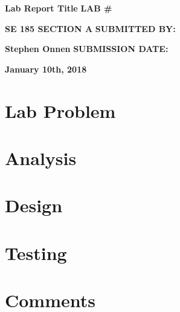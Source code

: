 \documentclass{article}
\begin{document}
%
%

\begin{titlepage} 
\begin{center}
\vspace*{\fill}
%
\Huge\textbf{Lab Report Title}
\vskip 0.5in
%
\large\textbf{LAB \#} \par
\Large\textbf{SE 185 SECTION A}
\vskip 0.5in
\large\textbf{SUBMITTED BY:} \par
\LARGE\textbf{Stephen Onnen}
\vskip 0.5in
\large\textbf{SUBMISSION DATE:} \par
\LARGE\textbf{January 10th, 2018}
\vspace*{\fill}
\end{center}
\end{titlepage}
\begin{normalsize} %

\section{Lab Problem} 



\vskip 0.25in
\section{Analysis}



\vskip 0.25in
\section{Design}



\vskip 0.25in
\section{Testing}



\vskip 0.25in
\section{Comments}



\end{normalsize}
\end{document}
